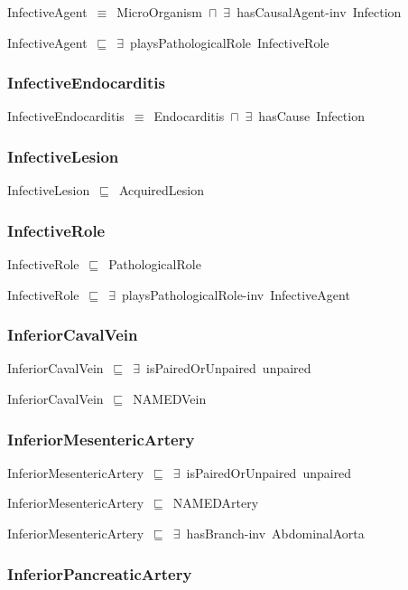 \documentclass{article}
\begin{document}
InfectiveAgent~\ensuremath{\equiv}~MicroOrganism~\ensuremath{\sqcap}~\ensuremath{\exists}~hasCausalAgent-inv~Infection

InfectiveAgent~\ensuremath{\sqsubseteq}~\ensuremath{\exists}~playsPathologicalRole~InfectiveRole~

\subsubsection*{InfectiveEndocarditis}

InfectiveEndocarditis~\ensuremath{\equiv}~Endocarditis~\ensuremath{\sqcap}~\ensuremath{\exists}~hasCause~Infection

\subsubsection*{InfectiveLesion}

InfectiveLesion~\ensuremath{\sqsubseteq}~AcquiredLesion~

\subsubsection*{InfectiveRole}

InfectiveRole~\ensuremath{\sqsubseteq}~PathologicalRole~

InfectiveRole~\ensuremath{\sqsubseteq}~\ensuremath{\exists}~playsPathologicalRole-inv~InfectiveAgent~

\subsubsection*{InferiorCavalVein}

InferiorCavalVein~\ensuremath{\sqsubseteq}~\ensuremath{\exists}~isPairedOrUnpaired~unpaired~

InferiorCavalVein~\ensuremath{\sqsubseteq}~NAMEDVein~

\subsubsection*{InferiorMesentericArtery}

InferiorMesentericArtery~\ensuremath{\sqsubseteq}~\ensuremath{\exists}~isPairedOrUnpaired~unpaired~

InferiorMesentericArtery~\ensuremath{\sqsubseteq}~NAMEDArtery~

InferiorMesentericArtery~\ensuremath{\sqsubseteq}~\ensuremath{\exists}~hasBranch-inv~AbdominalAorta~

\subsubsection*{InferiorPancreaticArtery}
\end{document}
